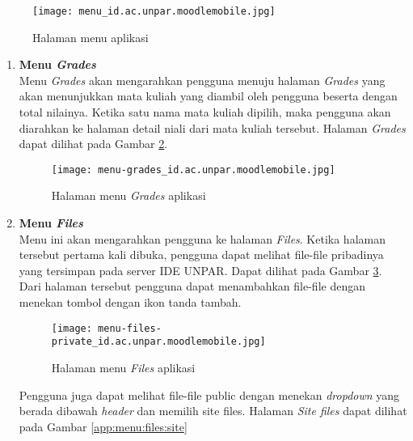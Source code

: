 \begin{figure}[H] 
	\centering  
	\texttt{[image: menu\_id.ac.unpar.moodlemobile.jpg]}  
	\caption[Halaman menu aplikasi] {Halaman menu aplikasi} 
	\label{app:menu} 
\end{figure}  

\begin{enumerate}
\item \textbf{Menu \textit{Grades}} \\
Menu \textit{Grades} akan mengarahkan pengguna menuju halaman \textit{Grades} yang akan menunjukkan mata kuliah yang diambil oleh pengguna beserta dengan total nilainya. Ketika satu nama mata kuliah dipilih, maka pengguna akan diarahkan ke halaman detail niali dari mata kuliah tersebut. Halaman \textit{Grades} dapat dilihat pada Gambar \ref{app:menu:grades}.

\begin{figure}[H] 
	\centering  
	\texttt{[image: menu-grades\_id.ac.unpar.moodlemobile.jpg]}  
	\caption[Halaman menu \textit{Grades} aplikasi] {Halaman menu \textit{Grades} aplikasi} 
	\label{app:menu:grades} 
\end{figure}  

\item \textbf{Menu \textit{Files}} \\

Menu ini akan mengarahkan pengguna ke halaman \textit{Files}. Ketika halaman tersebut pertama kali dibuka, pengguna dapat melihat file-file pribadinya yang tersimpan pada server IDE UNPAR. Dapat dilihat pada Gambar \ref{app:menu:files:private}. Dari halaman tersebut pengguna dapat menambahkan file-file dengan menekan tombol dengan ikon tanda tambah.


\begin{figure}[H] 
	\centering  
	\texttt{[image: menu-files-private\_id.ac.unpar.moodlemobile.jpg]}  
	\caption[Halaman menu \textit{Files} aplikasi] {Halaman menu \textit{Files} aplikasi} 
	\label{app:menu:files:private} 
\end{figure}  

 Pengguna juga dapat melihat file-file public dengan menekan \textit{dropdown} yang berada dibawah \textit{header} dan memilih site files. Halaman \textit{Site files} dapat dilihat pada Gambar \ref{app:menu:files:site}


\end{enumerate}
